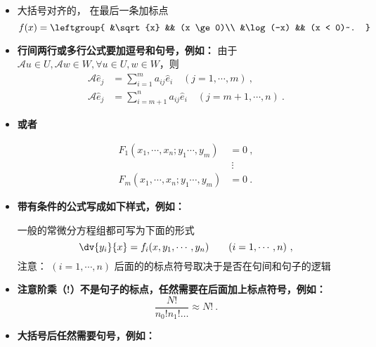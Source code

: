 
\begin{issues}
\issueDraft
\end{issues}
\begin{itemize}
\item 大括号对齐的， 在最后一条加标点
\begin{equation}
f(x) = \leftgroup{
    &\sqrt{x} && (x \ge 0)\\
    &\log(-x) && (x < 0)~.
}
\end{equation}

\item \textbf{行间两行或多行公式要加逗号和句号，例如：}
由于 $\mathcal{A}u\in U, \mathcal{A} w\in W,\forall  u\in U, w\in W$，则
\begin{equation}
\begin{aligned}
\mathcal{A}\hat e_j&=\sum_{i=1}^m a_{ij}\hat e_i\quad (j=1,\cdots ,m)~,\\
\mathcal{A}\hat e_j&=\sum_{i=m+1}^n a_{ij}\hat e_i\quad (j=m+1,\cdots ,n)~.
\end{aligned}
\end{equation}

\item \textbf{或者}

\begin{equation}
\begin{aligned}
F_1(x_1,\cdots,x_n;y_1\cdots,y_m)&=0~,\\
&\ \vdots\\
F_m(x_1,\cdots,x_n;y_1\cdots,y_m)&=0~.
\end{aligned}
\end{equation}

\item \textbf{带有条件的公式写成如下样式，例如：}

一般的常微分方程组都可写为下面的形式
\begin{equation}
\dv{y_i}{x}=f_i(x,y_1,\cdots,y_n) \qquad (i=1,\cdots,n)~,
\end{equation}
注意： $(i=1,\cdots,n)$ 后面的的标点符号取决于是否在句间和句子的逻辑

\item \textbf{注意阶乘（!）不是句子的标点，任然需要在后面加上标点符号，例如：}
\begin{equation}
\frac{N!}{n_0! n_1!\dots} \approx N!~.
\end{equation}

\item \textbf{大括号后任然需要句号，例如：}


\end{itemize}
